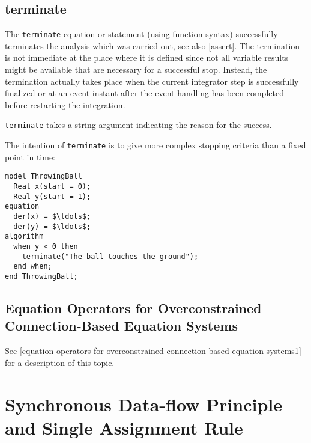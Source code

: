 \subsection{terminate}\label{terminate}

The \lstinline!terminate!-equation or statement (using function syntax) successfully terminates the analysis which was carried out, see also \cref{assert}.
The termination is not immediate at the place where it is defined since not all variable results might be available that are necessary for a successful stop.
Instead, the termination actually takes place when the current integrator step is successfully finalized or at an event instant after the event handling has been completed before restarting the integration.

\lstinline!terminate! takes a string argument indicating the reason for the success.

\begin{example}
The intention of \lstinline!terminate! is to give more complex stopping criteria than a fixed point in time:
\begin{lstlisting}[language=modelica]
model ThrowingBall
  Real x(start = 0);
  Real y(start = 1);
equation
  der(x) = $\ldots$;
  der(y) = $\ldots$;
algorithm
  when y < 0 then
    terminate("The ball touches the ground");
  end when;
end ThrowingBall;
\end{lstlisting}
\end{example}

\subsection{Equation Operators for Overconstrained Connection-Based Equation Systems}\label{equation-operators-for-overconstrained-connection-based-equation-systems}

See \cref{equation-operators-for-overconstrained-connection-based-equation-systems1} for a description of this topic.

\section{Synchronous Data-flow Principle and Single Assignment Rule}\label{synchronous-data-flow-principle-and-single-assignment-rule}

